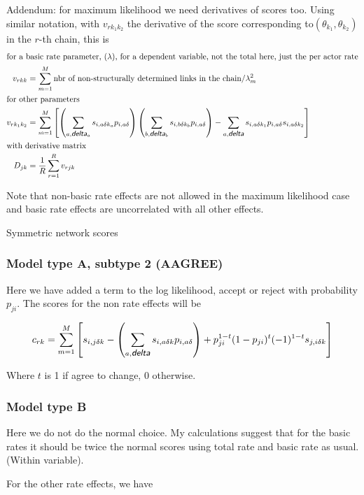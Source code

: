 \documentclass[12pt,a4paper]{article}
\makeatletter
\renewcommand{\=}{\,=\,}
\newcommand{\+}{\,+\,}
\newcommand{\nnm}[1]{\textsf{\small\textit{#1}}}
\renewcommand{\subsection}{\@startsection{subsection}{2}
                {0pt}{0.7\baselineskip}{0.3\baselineskip}
                {\sffamily} }
\makeatother
\begin{document}
Addendum: for maximum likelihood we need derivatives of scores too. Using
similar notation, with $v_{rk_1k_2}$ the derivative of the score corresponding
to$(\theta_{k_1}, \theta_{k_2})$  in the $r$-th chain,  this is
\begin{align*}
\intertext{for a basic rate parameter, $(\lambda)$, for a
dependent variable, not the total here, just the per actor rate}
v_{rkk} &= \sum_{m=1}^M  \textrm{nbr of non-structurally determined links in the
  chain}/ \lambda_m^2\\
\intertext{for other parameters}
v_{rk_1k_2}&= \sum_{m=1}^M \left [  \left( \sum_{a, \nnm{delta}_a}
  s_{i,a\delta k_a} p_{i,a\delta} \right) \left (
\sum_{ b, \nnm{delta}_b} s_{i,b\delta k_b} p_{i,a\delta} \right) -
\sum_{a, \nnm{delta}}
  s_{i,a\delta k_1}p_{i,a\delta}  s_{i,a\delta k_2}
\right ]\\
\intertext{with derivative matrix}
 D_{jk}&=\frac{1}{R}\sum_{r=1}^R v_{rjk}
\end{align*}

Note that non-basic rate effects are not allowed in the maximum likelihood
case and basic rate effects are uncorrelated with all other effects.

\subsection{Symmetric network scores}
\label{sec:symScores}
\subsubsection{Model type A, subtype 2 (AAGREE)}
Here we have added a term to the log likelihood, accept or reject with
probability $p_{ji}$. 
The scores for the non rate effects will be

$$c_{rk}= \sum_{m=1}^M \left [ s_{i,j\delta k}- \left(\sum_{a,\nnm{delta}}
  s_{i,a\delta k}p_{i,a\delta}\right) + 
p_{ji}^{1-t} (1-p_{ji})^t (-1)^{1-t}s_{j,i\delta
  k}\right]$$

Where $t$ is 1 if agree to change, 0 otherwise.
\subsubsection{Model type B}
Here we do not do the normal choice. My calculations suggest that for the basic
rates it should be twice the normal scores using total rate and basic rate as
usual. (Within variable).

For the other rate effects, we have
\end{document}
